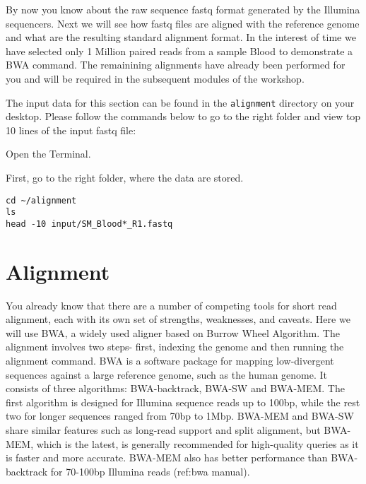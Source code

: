 \begin{information}
By now you know about the raw sequence fastq format generated by the Illumina sequencers. Next we will see how fastq files are aligned with the reference genome and what are the resulting standard alignment format. 
In the interest of time we have selected only 1 Million paired reads from a sample Blood to demonstrate a BWA command. The remainining alignments have already been performed for you and will be required in the subsequent modules of the workshop.

The input data for this section can be found in the \texttt{alignment}
directory on your desktop. Please follow the commands below to go to the right folder and view top 10 lines of the input fastq file:
\end{information}

\begin{steps}
Open the Terminal.

First, go to the right folder, where the data are stored.
\begin{lstlisting}
cd ~/alignment
ls
head -10 input/SM_Blood*_R1.fastq
\end{lstlisting}

\end{steps}

\section{Alignment}

\begin{information}
You already know that there are a number of competing tools for short read alignment, each with its own set of strengths, weaknesses, and caveats. Here we will use BWA, a widely used aligner based on Burrow Wheel Algorithm.  The alignment involves two steps- first, indexing the genome and then running the alignment command.  
BWA is a software package for mapping low-divergent sequences against a large reference genome, such as the human genome. It consists of three algorithms: BWA-backtrack, BWA-SW and BWA-MEM. The first algorithm is designed for Illumina sequence reads up to 100bp, while the rest two for longer sequences ranged from 70bp to 1Mbp. BWA-MEM and BWA-SW share similar features such as long-read support and split alignment, but BWA-MEM, which is the latest, is generally recommended for high-quality queries as it is faster and more accurate. BWA-MEM also has better performance than BWA-backtrack for 70-100bp Illumina reads (ref:bwa manual).
\end{information}

